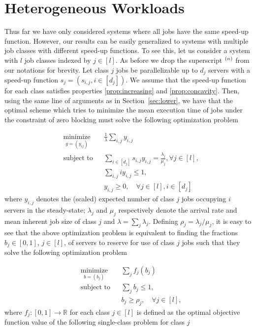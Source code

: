 \documentclass[a4paper]{article}
\theoremstyle{plain}
\theoremstyle{definition}
\theoremstyle{case}
\theoremstyle{remark}
\begin{document}
\section{Heterogeneous Workloads}
\label{sec:het}

Thus far we have only considered systems where all jobs have the same speed-up function. However, our results can be easily generalized to systems with multiple job classes with different speed-up functions. To see this, let us consider a system with $l$ job classes indexed by $j \in [l]$. As before we drop the superscript $\vphantom{\cdot}^{(n)}$ from our notations for brevity. Let class $j$ jobs be parallelizable up to $d_j$ servers with a speed-up function $s_j=(s_{i,j}, i \in [d_j])$. We assume that the speed-up function for each class satisfies properties \eqref{prop:increasing} and \eqref{prop:concavity}. Then, using the same line of arguments as in Section~\ref{sec:lower}, we have that the optimal scheme which tries to minimize the mean execution time of jobs under the constraint of zero blocking must solve the following optimization problem

\begin{equation}
        \begin{aligned}
        & \underset{y=(y_{ij})} {\text{minimize}}
        & & \frac{1}{\lambda}\sum_{i,j} y_{i,j}\\
        & \text{subject to}
        & & \sum_{i \in [d_j]} s_{i,j} y_{i,j} = \frac{\lambda_j}{\mu_j}, \forall j \in [l],\\
        & & &\sum_{i,j} i y_{i,j} \leq 1,\\
        & & &  y_{i,j} \geq 0, \quad \forall j \in [l], i \in [d_j]
        \end{aligned}
        \tag{Q}
    \label{eq:opt_het}
\end{equation}
%
where $y_{i,j}$ denotes the (scaled) expected number of class $j$ jobs occupying $i$ servers in the steady-state; $\lambda_j$ and $\mu_j$ respectively denote the arrival rate and mean inherent job size of class $j$ and $\lambda = \sum_j \lambda_j$. Defining $\rho_j=\lambda_j/\mu_j$, it is easy to see that the above optimization problem is equivalent to finding the fractions $b_j \in [0,1]$, $j \in [l]$,  of servers to reserve for use of class $j$ jobs such that they solve the following optimization problem

\begin{equation}
        \begin{aligned}
        & \underset{b=(b_{j})} {\text{minimize}}
        & & \sum_{j} f_j(b_j)\\
        & \text{subject to}
        & & \sum_{j} b_j \leq 1,\\
        & & &  b_{j} \geq \rho_j, \quad \forall j \in [l],
        \end{aligned}
        \tag{Q1}
    \label{eq:opt_het_outer}
\end{equation}
%
where $f_j:[0,1]\to \mathbb{R}$ for each class $j \in [l]$ is defined as the optimal objective function value of the following single-class problem for class $j$
\end{document}
